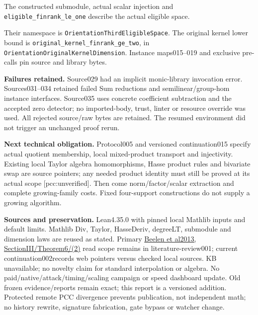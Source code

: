 \documentclass[10pt]{article}
\begin{document}
The constructed submodule, actual scalar injection and
\texttt{eligible\_finrank\_le\_one} describe the actual eligible space.

Their namespace is \texttt{OrientationThirdEligibleSpace}.
The original kernel lower bound is
\texttt{original\_kernel\_finrank\_ge\_two}, in
\texttt{OrientationOriginalKernelDimension}.
Instance maps015--019 and exclusive pre-calls pin source and library bytes.

\textbf{Failures retained.}
Source029 had an implicit monic-library invocation error.
Sources031--034 retained failed Sum reductions and semilinear/group-hom
instance interfaces. Source035 uses concrete coefficient subtraction and
the accepted zero detector; no imported-body, trust, linter or resource
override was used. All rejected source/raw bytes are retained.
The resumed environment did not trigger an unchanged proof rerun.

\textbf{Next technical obligation.}
Protocol005 and versioned continuation015 specify actual quotient membership,
local mixed-product transport and injectivity. Existing local Taylor algebra
homomorphisms, Hasse product rules and bivariate swap are source pointers;
any needed product identity must still be proved at its actual scope [pcc:unverified].
Then come norm/factor/scalar extraction and complete growing-family costs.
Fixed four-support constructions do not supply a growing algorithm.

\textbf{Sources and preservation.}
Lean4.35.0 with pinned local Mathlib inputs and default limits.
Mathlib Div, Taylor, HasseDeriv, degreeLT, submodule and dimension laws are
reused as stated. Primary
\href{https://doi.org/10.1109/TIT.2013.2243800}{Beelen et al2013, SectionIII/Theorem6/(2)}
read scope remains in literature-review001; current continuation002records
web pointers versus checked local sources. KB unavailable; no novelty claim
for standard interpolation or algebra.
No paid/native/attack/timing/scaling campaign or speed dashboard update.
Old frozen evidence/reports remain exact; this report is a versioned addition.
Protected remote PCC divergence prevents publication, not independent math;
no history rewrite, signature fabrication, gate bypass or watcher change.
\end{document}
